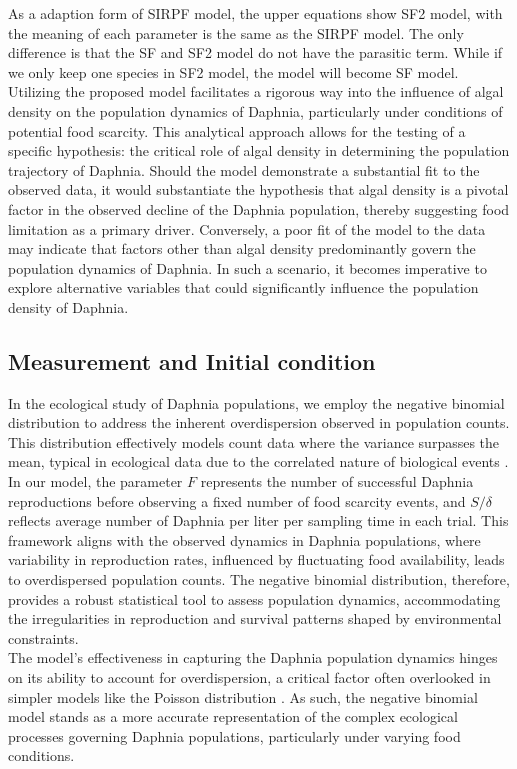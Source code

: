 \documentclass[12pt]{article}
\begin{document}
As a adaption form of SIRPF model, the upper equations show SF2 model, with the meaning of each parameter is the same as the SIRPF model. The only difference is that the SF and SF2 model do not have the parasitic term. While if we only keep one species in SF2 model, the model will become SF model. Utilizing the proposed model facilitates a rigorous way into the influence of algal density on the population dynamics of Daphnia, particularly under conditions of potential food scarcity. This analytical approach allows for the testing of a specific hypothesis: the critical role of algal density in determining the population trajectory of Daphnia. Should the model demonstrate a substantial fit to the observed data, it would substantiate the hypothesis that algal density is a pivotal factor in the observed decline of the Daphnia population, thereby suggesting food limitation as a primary driver. Conversely, a poor fit of the model to the data may indicate that factors other than algal density predominantly govern the population dynamics of Daphnia. In such a scenario, it becomes imperative to explore alternative variables that could significantly influence the population density of Daphnia.\\

\subsection{Measurement and Initial condition}
In the ecological study of Daphnia populations, we employ the negative binomial distribution to address the inherent overdispersion observed in population counts. This distribution effectively models count data where the variance surpasses the mean, typical in ecological data due to the correlated nature of biological events \cite{ning2021systemic}. In our model, the parameter $F$ represents the number of successful Daphnia reproductions before observing a fixed number of food scarcity events, and $S / \delta$ reflects average number of Daphnia per liter per sampling time in each trial. This framework aligns with the observed dynamics in Daphnia populations, where variability in reproduction rates, influenced by fluctuating food availability, leads to overdispersed population counts. The negative binomial distribution, therefore, provides a robust statistical tool to assess population dynamics, accommodating the irregularities in reproduction and survival patterns shaped by environmental constraints.\\

The model's effectiveness in capturing the Daphnia population dynamics hinges on its ability to account for overdispersion, a critical factor often overlooked in simpler models like the Poisson distribution \cite{breto2011compound}. As such, the negative binomial model stands as a more accurate representation of the complex ecological processes governing Daphnia populations, particularly under varying food conditions.
\end{document}
